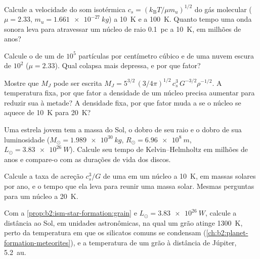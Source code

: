 \begin{exercise}[$\star$]\label{exo:b2:ism-star-formation:3}
Calcule a velocidade do som isotérmica $c_s = (k_{\mathrm B}T/\mu m_u)^{1/2}$ do
gás molecular ($\mu = 2.33$, $m_u = \qty{1.661e-27}{kg}$) a \qty{10}{K} e a
\qty{100}{K}. Quanto tempo uma onda sonora leva para atravessar um núcleo de raio
\qty{0.1}{pc} a \qty{10}{K}, em milhões de anos?
\end{exercise}

\begin{exercise}[$\star$]\label{exo:b2:ism-star-formation:4}
Calcule o  de um  de $10^5$ partículas por centímetro
cúbico e de uma nuvem escura de $10^2$ ($\mu = 2.33$). Qual colapsa
mais depressa, e por que fator?
\end{exercise}

\begin{exercise}[$\star\star$]\label{exo:b2:ism-star-formation:5}
Mostre que $M_J$ pode ser escrita $M_J = 5^{3/2}\,(3/4\pi)^{1/2}\,c_s^3\,G^{-3/2}\rho^{-1/2}$.
A temperatura fixa, por que fator a densidade de um núcleo precisa aumentar para reduzir
sua  à metade? A densidade fixa, por que fator muda a  se
o núcleo se aquece de \qty{10}{K} para \qty{20}{K}?
\end{exercise}

\begin{exercise}[$\star\star$]\label{exo:b2:ism-star-formation:6}
Uma estrela jovem tem a massa do Sol, o dobro de seu raio e o dobro de sua luminosidade
($M_\odot = \qty{1.989e30}{kg}$, $R_\odot = \qty{6.96e8}{m}$,
$L_\odot = \qty{3.83e26}{W}$). Calcule seu tempo de Kelvin--Helmholtz em milhões de
anos e compare-o com as durações de vida dos discos.
\end{exercise}

\begin{exercise}[$\star\star$]\label{exo:b2:ism-star-formation:7}
Calcule a taxa de acreção $c_s^3/G$ de uma  em um núcleo a \qty{10}{K}, em
massas solares por ano, e o tempo que ela leva para reunir uma massa solar. Mesmas
perguntas para um núcleo a \qty{20}{K}.
\end{exercise}

\begin{exercise}[$\star\star$]\label{exo:b2:ism-star-formation:8}
Com a \cref{prop:b2:ism-star-formation:grain} e $L_\odot = \qty{3.83e26}{W}$,
calcule a distância ao Sol, em unidades astronômicas, na qual um grão
atinge \qty{1300}{K}, perto da temperatura em que os silicatos comuns
se condensam (\cref{ch:b2:planet-formation-meteorites}), e
a temperatura de um grão à distância de Júpiter, \qty{5.2}{au}.
\end{exercise}

